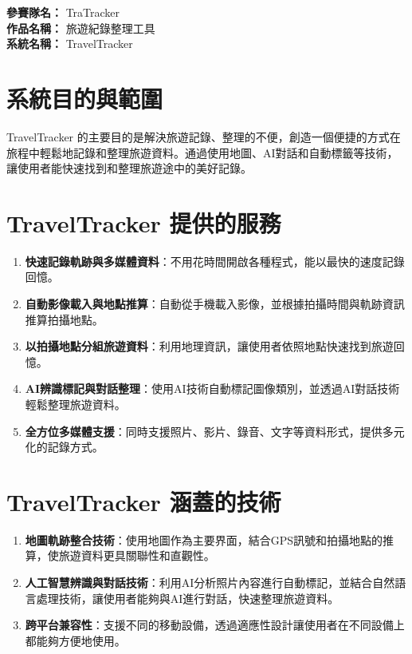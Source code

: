 \documentclass[12pt]{article}
\begin{document}
\date{}
\usetikzlibrary{automata, positioning, arrows}
{}
\renewcommand{\arraystretch}{1.45}

\noindent
\textbf{參賽隊名：} TraTracker \\
\textbf{作品名稱：} 旅遊紀錄整理工具 \\
\textbf{系統名稱：} TravelTracker

\section{系統目的與範圍}

TravelTracker 的主要目的是解決旅遊記錄、整理的不便，創造一個便捷的方式在旅程中輕鬆地記錄和整理旅遊資料。通過使用地圖、AI對話和自動標籤等技術，讓使用者能快速找到和整理旅遊途中的美好記錄。

\section{TravelTracker 提供的服務}
\begin{enumerate}
  \item \textbf{快速記錄軌跡與多媒體資料}：不用花時間開啟各種程式，能以最快的速度記錄回憶。
  \item \textbf{自動影像載入與地點推算}：自動從手機載入影像，並根據拍攝時間與軌跡資訊推算拍攝地點。
  \item \textbf{以拍攝地點分組旅遊資料}：利用地理資訊，讓使用者依照地點快速找到旅遊回憶。
  \item \textbf{AI辨識標記與對話整理}：使用AI技術自動標記圖像類別，並透過AI對話技術輕鬆整理旅遊資料。
  \item \textbf{全方位多媒體支援}：同時支援照片、影片、錄音、文字等資料形式，提供多元化的記錄方式。
\end{enumerate}

\section{TravelTracker 涵蓋的技術}
\begin{enumerate}
  \item \textbf{地圖軌跡整合技術}：使用地圖作為主要界面，結合GPS訊號和拍攝地點的推算，使旅遊資料更具關聯性和直觀性。
  \item \textbf{人工智慧辨識與對話技術}：利用AI分析照片內容進行自動標記，並結合自然語言處理技術，讓使用者能夠與AI進行對話，快速整理旅遊資料。
  \item \textbf{跨平台兼容性}：支援不同的移動設備，透過適應性設計讓使用者在不同設備上都能夠方便地使用。
\end{enumerate}
\end{document}
